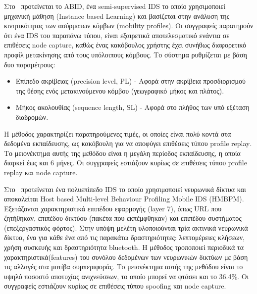 \documentclass[12pt]{report}
\begin{document}
Στο~\cite{paper:15} προτείνεται το \textlatin{ABID}, ένα \textlatin{semi-supervised IDS} το οποίο χρησιμοποιεί μηχανική μάθηση (\textlatin{Instance based Learning}) και βασίζεται στην ανάλυση της κινητικότητας των ασύρματων κόμβων (\textlatin{mobility profiles}). Οι συγγραφείς παρατηρούν ότι ένα \textlatin{IDS} του παραπάνω τύπου, είναι εξαιρετικά αποτελεσματικό ενάντια σε επιθέσεις \textlatin{node capture}, καθώς ένας κακόβουλος χρήστης έχει συνήθως διαφορετικό προφίλ μετακίνησης από τους υπόλοιπους κόμβους. Το σύστημα ρυθμίζεται με βάση δυο παραμέτρους:
\begin{itemize}
	\item Επίπεδο ακρίβειας (\textlatin{precision level, PL}) - Αφορά στην ακρίβεια προσδιορισμού της θέσης ενός μετακινούμενου κόμβου (γεωγραφικό μήκος και πλάτος).
	\item Μήκος ακολουθίας (\textlatin{sequence length, SL}) - Αφορά στο πλήθος των υπό εξέταση διαδρομών.
\end{itemize}
Η μέθοδος χαρακτηρίζει παρατηρούμενες τιμές, οι οποίες είναι πολύ κοντά στα δεδομένα εκπαίδευσης, ως κακόβουλη για να αποφύγει επιθέσεις τύπου \textlatin{profile replay}. Το μειονέκτημα αυτής της μεθόδου είναι η μεγάλη περίοδος εκπαίδευσης, η οποία διαρκεί έως και 6 μήνες. Οι συγγραφείς εστιάζουν κυρίως σε επιθέσεις τύπου \textlatin{profile replay} και \textlatin{node capture}.

Στο~\cite{paper:16} προτείνεται ένα πολυεπίπεδο \textlatin{IDS} το οποίο χρησιμοποιεί νευρωνικά δίκτυα και αποκαλείται \textlatin{Host based Multi-level Behaviour Profiling Mobile IDS (HMBPM)}. Εξετάζονται χαρακτηριστικά επιπέδου εφαρμογής (\textlatin{layer 7}), όπως \textlatin{URL} που ζητήθηκαν, επιπέδου δικτύου (πακέτα που εκπέμφθηκαν) και επιπέδου συστήματος (επεξεργαστικός φόρτος). Στην υπόψη μελέτη υλοποιούνται τρία ακτινικά νευρωνικά δίκτυα, ένα για κάθε ένα από τις παρακάτω δραστηριότητες: λεπτομέρειες κλήσεων, χρήση συσκευής και δραστηριότητα \textlatin{bluetooth}. Η μέθοδος τροποποιεί περιοδικά τα χαρακτηριστικά(\textlatin{features}) του συνόλου δεδομένων των νευρωνικών δικτύων με βάση τις αλλαγές στα μοτίβα συμπεριφοράς. Το μειονέκτημα αυτής της μεθόδου είναι το υψηλό ποσοστό αποτυχίας ανιχνεύσεων, το οποίο μπορεί να φτάσει και το 36.4\%. Οι συγγραφείς εστιάζουν κυρίως σε επιθέσεις τύπου \textlatin{spoofing} και \textlatin{node capture}.
\end{document}
